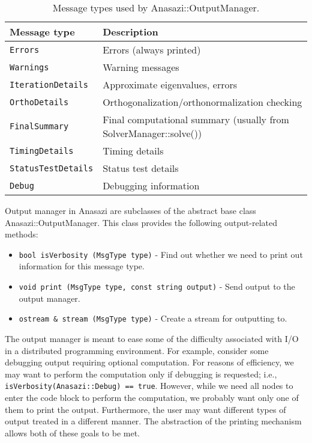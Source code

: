 \begin{table}
\begin{center}
  \begin{tabular}{| p{4cm} p{8cm} |}
\hline
Message type & Description \\
\hline
{\tt Errors           } & Errors (always printed)  \\
{\tt Warnings         } & Warning messages   \\
{\tt IterationDetails } & Approximate eigenvalues, errors   \\
{\tt OrthoDetails     } & Orthogonalization/orthonormalization checking \\
{\tt FinalSummary     } & Final computational summary (usually from SolverManager::solve())  \\
{\tt TimingDetails    } & Timing details  \\
{\tt StatusTestDetails} & Status test details   \\
{\tt Debug            } & Debugging information \\
\hline
\end{tabular}
\caption{Message types used by Anasazi::OutputManager.}
\label{tab:anasazi:om}
\end{center}
\end{table}

Output manager in Anasazi are subclasses of the abstract base class
Anasazi::OutputManager. This class provides the following output-related methods:
\begin{itemize}
  \item {\tt bool isVerbosity (MsgType type)} - 
  Find out whether we need to print out information for this message type.
\item {\tt void  print (MsgType type, const string output)} - 
  Send output to the output manager.
\item {\tt ostream \& stream (MsgType type)} - 
  Create a stream for outputting to.
\end{itemize}

The output manager is meant to ease some of the difficulty associated with I/O in a
distributed programming environment. For example, consider some debugging output requiring
optional computation. For reasons of efficiency, we may want to perform the computation
only if debugging is requested; i.e., \verb!isVerbosity(Anasazi::Debug) == true!. However,
while we need all nodes to enter the code block to perform the computation, we probably
want only one of them to print the output. Furthermore, the user may want different types
of output treated in a different manner. The abstraction of the printing
mechanism allows both of these goals to be met.

